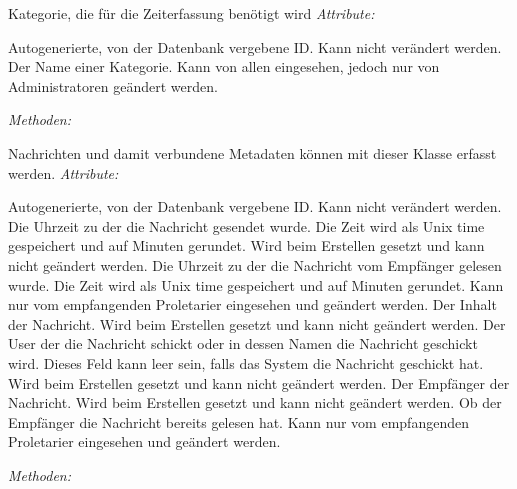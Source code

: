 \begin{itemize}
                Kategorie, die für die Zeiterfassung benötigt wird
                \emph{Attribute:}
                \begin{itemize}
                        Autogenerierte, von der Datenbank vergebene ID.
                        Kann nicht verändert werden.
                        Der Name einer Kategorie.
                        Kann von allen eingesehen, jedoch nur von Administratoren geändert werden.
                \end{itemize}
                \emph{Methoden:}
                \begin{itemize}
                \end{itemize}

                Nachrichten und damit verbundene Metadaten können mit dieser Klasse erfasst werden.
                \emph{Attribute:}
                \begin{itemize}
                        Autogenerierte, von der Datenbank vergebene ID.
                        Kann nicht verändert werden.
                        Die Uhrzeit zu der die Nachricht gesendet wurde.
                        Die Zeit wird als Unix time gespeichert und auf Minuten gerundet.
                        Wird beim Erstellen gesetzt und kann nicht geändert werden.
                        Die Uhrzeit zu der die Nachricht vom Empfänger gelesen wurde.
                        Die Zeit wird als Unix time gespeichert und auf Minuten gerundet.
                        Kann nur vom empfangenden Proletarier eingesehen und geändert werden.
                        Der Inhalt der Nachricht.
                        Wird beim Erstellen gesetzt und kann nicht geändert werden.
                        Der User der die Nachricht schickt oder in dessen Namen die Nachricht geschickt wird.
                        Dieses Feld kann leer sein, falls das System die Nachricht geschickt hat.
                        Wird beim Erstellen gesetzt und kann nicht geändert werden.
                        Der Empfänger der Nachricht.
                        Wird beim Erstellen gesetzt und kann nicht geändert werden.
                        Ob der Empfänger die Nachricht bereits gelesen hat.
                        Kann nur vom empfangenden Proletarier eingesehen und geändert werden.
                \end{itemize}
                \emph{Methoden:}
                \begin{itemize}
                \end{itemize}


\end{itemize}
